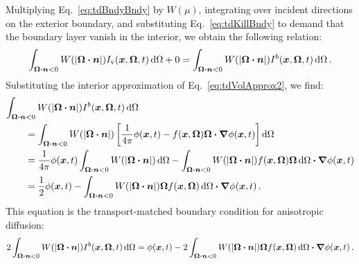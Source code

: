 Multiplying Eq.~\eqref{eq:tdBndyBndy} by $W(\mu)$, integrating over incident
directions on the exterior boundary, and substituting
Eq.~\eqref{eq:tdKillBndy} to demand that the boundary layer vanish in the
interior, we obtain
the following relation:
\begin{equation*}
  \int_{\bm{\Omega}\bm{\cdot}\bm{n} < 0}
  W(\left| \bm{\Omega}\bm{\cdot}\bm{n} \right|)
I_\mathrm{v}(\bm{x},\bm{\Omega},t) \mathop{}\!\mathrm{d}\Omega
+ 0
= 
  \int_{\bm{\Omega}\bm{\cdot}\bm{n} < 0}
  W(\left| \bm{\Omega}\bm{\cdot}\bm{n} \right|)
I^b(\bm{x},\bm{\Omega},t) \mathop{}\!\mathrm{d}\Omega \,.
\end{equation*}
Substituting the interior approximation of Eq.~\eqref{eq:tdVolApprox2}, we find:
\begin{align*} \nonumber
\lefteqn{\int_{\vec{\Omega}\vd\vec{n} < 0} W(\abs{\vec{\Omega}\vd\vec{n}})
I^b(\vec{x},\vec{\Omega},t) \ud\Omega}
\qquad&
\\ \nonumber
&= 
\int_{\vec{\Omega}\vd\vec{n} < 0}
W(\abs{\vec{\Omega}\vd\vec{n}})
\left[  \frac{1}{4\pi} \phi (\vec{x},t)
  - f(\vec{x}, \vec{\Omega})\vec{\Omega}\vd \grad \phi(\vec{x},t)
\right] \ud \Omega
\\ \nonumber
&=
\frac{1}{4\pi} \phi(\vec{x},t)
\int_{\vec{\Omega}\vd\vec{n} < 0} W(\abs{\vec{\Omega}\vd\vec{n}}) \ud\Omega
- \int_{\vec{\Omega}\vd\vec{n} < 0}  W(\abs{\vec{\Omega}\vd\vec{n}})
f(\vec{x}, \vec{\Omega})\vec{\Omega} \ud\Omega \vd \grad \phi(\vec{x},t)
\\
&= \frac{1}{2} \phi(\vec{x},t)
- \int_{\vec{\Omega}\vd\vec{n} < 0} W(\abs{\vec{\Omega}\vd\vec{n}})
\vec{\Omega} f(\vec{x}, \vec{\Omega}) \ud\Omega \vd \grad \phi(\vec{x},t)\,.
\end{align*}
This equation is the transport-matched boundary condition for anisotropic
diffusion:
\begin{equation} \label{eq:loBc}
2\int_{\bm{\Omega}\bm{\cdot}\bm{n} < 0} W(\left| \bm{\Omega}\bm{\cdot}\bm{n} \right|)
I^b(\bm{x},\bm{\Omega},t) \mathop{}\!\mathrm{d}\Omega
=
\phi(\bm{x},t)
- 2\int_{\bm{\Omega}\bm{\cdot}\bm{n} < 0} W(\left| \bm{\Omega}\bm{\cdot}\bm{n} \right|)
\bm{\Omega} f(\bm{x}, \bm{\Omega}) \mathop{}\!\mathrm{d}\Omega \bm{\cdot} \bm{\nabla} \phi(\bm{x},t)\,.
\end{equation}

